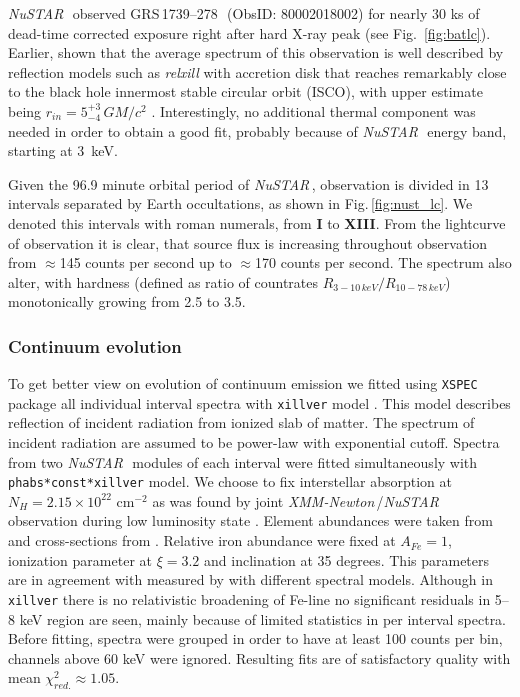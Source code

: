 \documentclass[a4paper,fleqn,usenatbib]{mnras}
\def\grs{{GRS\,1739--278\,}}
\def\xmm{{\em XMM-Newton\,}}
\def\nustar{{\em NuSTAR\,}}
\begin{document}
\nustar\, observed \grs\ (ObsID: 80002018002) for nearly 30 ks of dead-time corrected exposure right after hard X-ray peak (see Fig.~\ref{fig:batlc}). Earlier, \cite{miller15_nust} shown that the average spectrum of this observation is well described by reflection models such as {\it relxill} \citep{garcia14, dauser14,dauser16} with accretion disk that reaches remarkably close to the black hole innermost stable circular orbit (ISCO), with upper estimate being $r_{in} = 5^{+3}_{-4}\, G M/c^{2}$ \citep{miller15_nust}. Interestingly, no additional thermal component was needed in order to obtain a good fit, probably because of \nustar\, energy band, starting at 3~keV. 

Given the 96.9 minute orbital period of \nustar, observation is divided in 13 intervals separated by Earth occultations, as shown in Fig.\,\ref{fig:nust_lc}. We denoted this intervals with roman numerals, from {\bf I} to {\bf XIII}. From the lightcurve of observation it is clear, that source flux is increasing throughout observation from $\approx$145 counts per second up to $\approx$170 counts per second. 
The spectrum also alter, with hardness (defined as ratio of countrates  $R_{3-10\,keV}/R_{10-78\,keV}$) monotonically growing from 2.5 to 3.5. 

\subsubsection{Continuum evolution}
To get better view on evolution of continuum emission we fitted using \texttt{XSPEC} package \citep{arnaud96} all individual interval spectra with \texttt{xillver} model \citep{garcia13}. This model describes reflection of incident radiation from ionized slab of matter. The spectrum of incident radiation are assumed to be power-law with exponential cutoff. Spectra from two \nustar\, modules of each interval were fitted simultaneously with \texttt{phabs*const*xillver} model. We choose to fix interstellar absorption at $N_{H} = 2.15\times10^{22}$ cm$^{-2}$  as was found by joint \xmm/\nustar\, observation during low luminosity state \citep{fuerst16}. Element abundances were taken from \cite{wilms00} and cross-sections from \cite{verner96}. Relative iron abundance were fixed at
 $A_{Fe} = 1$, ionization parameter at $\xi=3.2$ and inclination at 35 degrees. This parameters are in agreement with measured by \cite{miller15_nust} with different spectral models. Although in  \texttt{xillver} there is no relativistic broadening of Fe-line no significant residuals in 5--8 keV region are seen, mainly because of limited statistics in per interval spectra. Before fitting, spectra were grouped in order to have at least 100 counts per bin, channels above 60 keV were ignored. Resulting fits are of satisfactory quality with mean $\chi^{2}_{red.} \approx 1.05$. 
 
\end{document}
